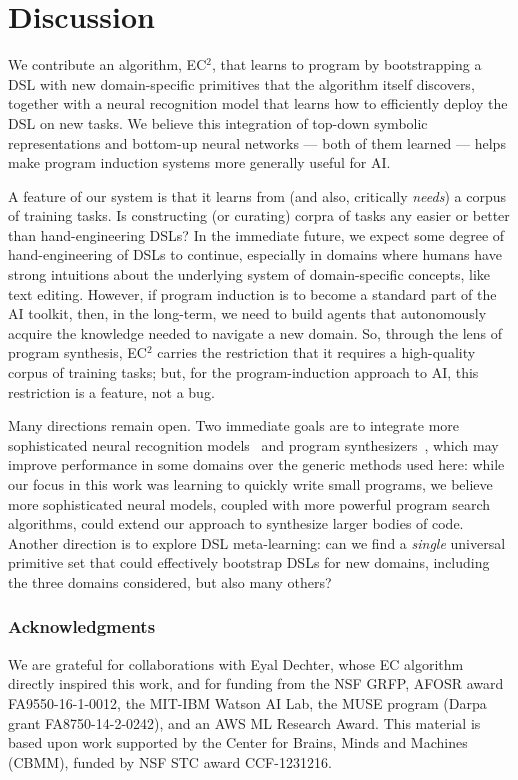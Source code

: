 \documentclass{article}
\newcommand{\systemEnding}{\textsc{EC$^2$}}
\begin{document}
 
 
 

 \section{Discussion}

We contribute an algorithm, \systemEnding, that learns to program by
bootstrapping a DSL with new domain-specific primitives that the algorithm
itself discovers, together with a neural recognition model that learns how to
efficiently deploy the DSL on new tasks. We believe this integration of top-down
symbolic representations and bottom-up neural networks --- both of them learned
--- helps make program induction systems more generally useful for AI.

A feature of our system
is that it learns from (and also, critically \emph{needs})
a corpus of training tasks.  Is constructing (or curating) corpra of tasks any easier or
 better than hand-engineering DSLs?  In the immediate future, we
 expect some degree of hand-engineering of DSLs to continue, especially
 in domains where humans have strong intuitions about the underlying
 system of domain-specific concepts, like text editing. However, if
 program induction is to become a standard part of the AI toolkit,
 then, in the long-term, we need to build agents that autonomously
 acquire the  knowledge needed to navigate a new
 domain.  So, through the lens of program synthesis, EC$^2$ carries
 the restriction that it requires a high-quality corpus of training
 tasks; but, for the program-induction approach to AI, this restriction
 is a feature, not a bug.


Many
directions remain open.
Two immediate goals are to integrate more sophisticated neural recognition
models~\cite{devlin2017robustfill} and program
synthesizers~\cite{solar2008program}, which may improve performance in some
domains over the generic methods used here:
while our focus in this work was
learning to quickly write small programs,
we believe more sophisticated neural models,
coupled with more powerful program search algorithms,
could extend our approach to
synthesize larger bodies of code.
Another direction is to explore DSL meta-learning: can we find a
\emph{single} universal primitive set that could effectively bootstrap DSLs for
new domains, including the three domains considered,  but also many others?

\subsubsection*{Acknowledgments} We are grateful for collaborations with Eyal Dechter, whose EC algorithm directly inspired this work, and for funding from the NSF GRFP, AFOSR award FA9550-16-1-0012, the MIT-IBM Watson AI Lab, the MUSE program (Darpa grant FA8750-14-2-0242),
and an AWS ML Research Award.
This material is based upon work supported by the Center for Brains, Minds and Machines (CBMM), funded by NSF STC award CCF-1231216.



{\small }
\end{document}

